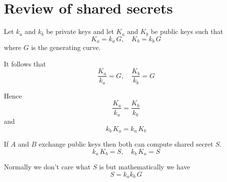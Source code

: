 \documentclass[12pt]{article}
\begin{document}
\section*{Review of shared secrets}

Let $k_a$ and $k_b$ be private keys and let $K_a$ and $K_b$ be public keys such that
\begin{equation*}
K_a=k_a\,G,\quad K_b=k_b\,G
\end{equation*}
where $G$ is the generating curve.

\bigskip
It follows that
\begin{equation*}
\frac{K_a}{k_a}=G,\quad \frac{K_b}{k_b}=G
\end{equation*}

Hence
\begin{equation*}
\frac{K_a}{k_a}=\frac{K_b}{k_b}
\end{equation*}
and
\begin{equation*}
k_b\,K_a=k_a\,K_b
\end{equation*}

If $A$ and $B$ exchange public keys then both can compute shared secret $S$.
\begin{equation*}
k_a\,K_b=S,\quad k_b\,K_a=S
\end{equation*}

Normally we don't care what $S$ is but mathematically we have
\begin{equation*}
S=k_ak_b\,G
\end{equation*}
\end{document}
